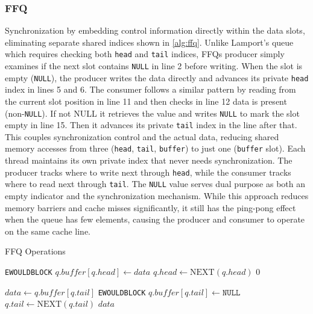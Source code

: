 \subsubsection{\acl{FFQ}}
Synchronization by embedding control information directly within the data slots, eliminating separate shared indices shown in \cref{alg:ffq}. Unlike Lamport's queue which requires checking both \texttt{head} and \texttt{tail} indices, \acsp{FFQ} producer simply examines if the next slot contains \texttt{NULL} in line 2 before writing. When the slot is empty (\texttt{NULL}), the producer writes the data directly and advances its private \texttt{head} index in lines 5 and 6. The consumer follows a similar pattern by reading from the current slot position in line 11 and then checks in line 12 data is present (non-\texttt{NULL}). If not NULL it retrieves the value and writes \texttt{NULL} to mark the slot empty in line 15. Then it advances its private \texttt{tail} index in the line after that. This couples synchronization control and the actual data, reducing shared memory accesses from three (\texttt{head}, \texttt{tail}, \texttt{buffer}) to just one (\texttt{buffer} slot). Each thread maintains its own private index that never needs synchronization. The producer tracks where to write next through \texttt{head}, while the consumer tracks where to read next through \texttt{tail}. The \texttt{NULL} value serves dual purpose as both an empty indicator and the synchronization mechanism. While this approach reduces memory barriers and cache misses significantly, it still has the ping-pong effect when the queue has few elements, causing the producer and consumer to operate on the same cache line. \cite{ffq} 

\begin{algorithm}[!ht]
    \centering
    \captionsetup{justification=centering}
    \caption{\acl{FFQ} Operations \cite{ffq}}
    \label{alg:ffq}
    \scriptsize
    \begin{algorithmic}[1]
                \State \Return \texttt{EWOULDBLOCK}
            \EndIf
            \State $q.buffer[q.head] \gets data$
            \State $q.head \gets \text{NEXT}(q.head)$
            \State \Return $0$
        \EndFunction
        
        \State
        
            \State $data \gets q.buffer[q.tail]$
                \State \Return \texttt{EWOULDBLOCK}
            \EndIf
            \State $q.buffer[q.tail] \gets \texttt{NULL}$
            \State $q.tail \gets \text{NEXT}(q.tail)$
            \State \Return $data$
        \EndFunction
    \end{algorithmic}
 \end{algorithm}

